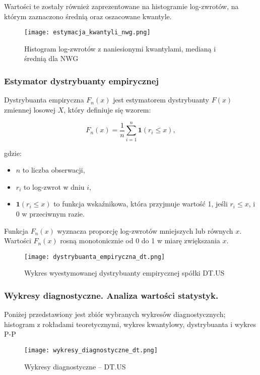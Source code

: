 \documentclass[a4paper,11pt]{article}
\begin{document}
Wartości te zostały również zaprezentowane na histogramie log-zwrotów, na którym zaznaczono średnią oraz oszacowane kwantyle.

\begin{figure}[h]
\centering
\texttt{[image: estymacja\_kwantyli\_nwg.png]}
\caption{Histogram log-zwrotów z naniesionymi kwantylami, medianą i średnią dla NWG}
\end{figure}

\subsubsection{Estymator dystrybuanty empirycznej}

Dystrybuanta empiryczna \( F_n(x) \) jest estymatorem dystrybuanty \( F(x) \) zmiennej losowej \( X \), który definiuje się wzorem:

\[
F_n(x) = \frac{1}{n} \sum_{i=1}^n \mathbf{1}(r_i \leq x),
\]

gdzie:
\begin{itemize}
    \item \( n \) to liczba obserwacji,
    \item \( r_i \) to log-zwrot w dniu \( i \),
    \item \( \mathbf{1}(r_i \leq x) \) to funkcja wskaźnikowa, która przyjmuje wartość 1, jeśli \( r_i \leq x \), i 0 w przeciwnym razie.
\end{itemize}

Funkcja \( F_n(x) \) wyznacza proporcję log-zwrotów mniejszych lub równych \( x \). Wartości \( F_n(x) \) rosną monotonicznie od 0 do 1 w miarę zwiększania \( x \).

\begin{figure}[h]
\centering
\texttt{[image: dystrybuanta\_empiryczna\_dt.png]}
\caption{Wykres wyestymowanej dystrybuanty empirycznej spółki DT.US}
\end{figure}





\subsubsection{Wykresy diagnostyczne. Analiza wartości statystyk.}
Poniżej przedstawiony jest zbiór wybranych wykresów diagnostycznych; histogram z rokładami teoretycznymi, wykres kwantylowy, dystrybuanta i wykres P-P
\begin{figure}[h]
\centering
\texttt{[image: wykresy\_diagnostyczne\_dt.png]}
\caption{Wykresy diagnostyczne -- DT.US}
\end{figure}
\end{document}
